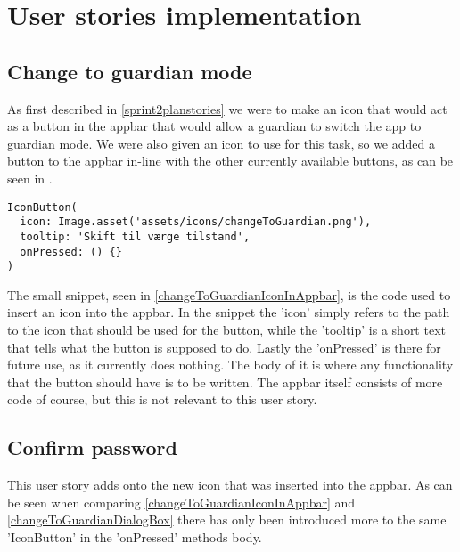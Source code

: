 \section{User stories implementation}

\subsection{Change to guardian mode} \label{changeToGuardianIconImpl}
As first described in \autoref{sprint2planstories} we were to make an icon that would act as a button in the appbar that would allow a guardian to switch the app to guardian mode.
We were also given an icon to use for this task, so we added a button to the appbar in-line with the other currently available buttons, as can be seen in .



\lstset{
  caption=The code used to insert the change to guardian icon in the appbar,
  label=changeToGuardianIconInAppbar
}

\begin{lstlisting}
IconButton(
  icon: Image.asset('assets/icons/changeToGuardian.png'),
  tooltip: 'Skift til værge tilstand', 
  onPressed: () {}
)
\end{lstlisting}

The small snippet, seen in \autoref{changeToGuardianIconInAppbar}, is the code used to insert an icon into the appbar. 
In the snippet the 'icon' simply refers to the path to the icon that should be used for the button, while the 'tooltip' is a short text that tells what the button is supposed to do. 
Lastly the 'onPressed' is there for future use, as it currently does nothing. 
The body of it is where any functionality that the button should have is to be written.
The appbar itself consists of more code of course, but this is not relevant to this user story.

\subsection{Confirm password} \label{changeToGuardianDialogBoxImpl}
This user story adds onto the new icon that was inserted into the appbar. 
As can be seen when comparing \autoref{changeToGuardianIconInAppbar} and \autoref{changeToGuardianDialogBox} there has only been introduced more to the same 'IconButton' in the 'onPressed' methods body.

